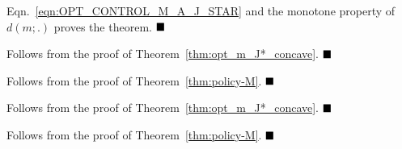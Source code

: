 \documentclass[journal]{IEEEtran}
\begin{document}

Eqn.~\ref{eqn:OPT_CONTROL_M_A_J_STAR} and the monotone property of $d(m;.)$ 
proves the theorem.  
$\hfill\blacksquare$








Follows from the proof of Theorem~\ref{thm:opt_m_J*_concave}.
$\hfill\blacksquare$




Follows from the proof of Theorem~\ref{thm:policy-M}.
$\hfill\blacksquare$







Follows from the proof of Theorem~\ref{thm:opt_m_J*_concave}.
$\hfill\blacksquare$




Follows from the proof of Theorem~\ref{thm:policy-M}.
$\hfill\blacksquare$





















\ifCLASSOPTIONcaptionsoff
  \newpage
\fi








  
\end{document}
